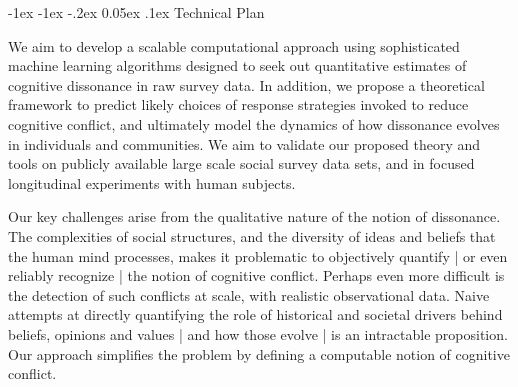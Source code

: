 \documentclass[onecolumn, compsoc,11pt]{IEEEtran}
\makeatletter
\renewcommand\section{\@startsection {section}{1}{\z@}%
                                   {-1ex \@plus -1ex \@minus -.2ex}%
                                   {0.05ex \@plus.1ex}%
                                   {\large\bfseries\scshape}}
\makeatother
\begin{document}
\section{Technical Plan}


We aim to develop a scalable computational approach using sophisticated machine learning  algorithms  designed to seek out quantitative estimates of cognitive dissonance in raw survey data. In addition,  we propose a theoretical framework to  predict likely choices of  response strategies invoked   to reduce cognitive conflict, and ultimately model the dynamics of how dissonance evolves in individuals and communities. We aim to validate our proposed theory and tools  on publicly available large scale  social survey data sets, and in focused longitudinal experiments with human subjects.

Our key challenges  arise  from the qualitative nature of the notion of dissonance. The  complexities of social structures, and the diversity of ideas and beliefs that the human mind processes,  makes it  problematic to objectively  quantify | or even reliably recognize |  the notion of cognitive conflict. Perhaps even more difficult is the detection of  such conflicts at scale, with realistic observational data.  Naive attempts at directly quantifying the role of  historical and societal  drivers behind  beliefs, opinions and values | and how those  evolve |  is an intractable proposition.
%
Our approach simplifies the problem by defining a computable notion of   cognitive conflict.
%
\end{document}
